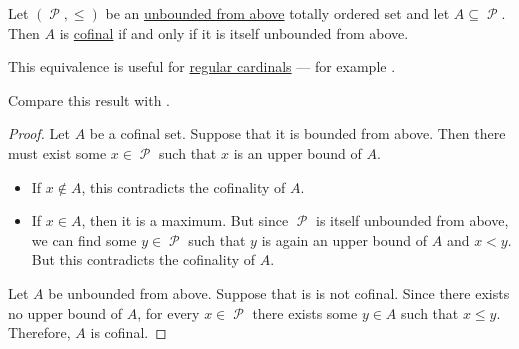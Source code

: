 \begin{proposition}\label{thm:totally_ordered_cofinal_equivalences}
  Let \( (\mscrP, \leq) \) be an \hyperref[def:partially_ordered_set_extremal_points/upper_and_lower_bounds]{unbounded from above} totally ordered set and let \( A \subseteq \mscrP \). Then \( A \) is \hyperref[def:cofinal_set]{cofinal} if and only if it is itself unbounded from above.

  This equivalence is useful for \hyperref[def:regular_cardinal]{regular cardinals} --- for example .

  Compare this result with .
\end{proposition}
\begin{proof}
  \SufficiencySubProof Let \( A \) be a cofinal set. Suppose that it is bounded from above. Then there must exist some \( x \in \mscrP \) such that \( x \) is an upper bound of \( A \).
  \begin{itemize}
    \item If \( x \not\in A \), this contradicts the cofinality of \( A \).
    \item If \( x \in A \), then it is a maximum. But since \( \mscrP \) is itself unbounded from above, we can find some \( y \in \mscrP \) such that \( y \) is again an upper bound of \( A \) and \( x < y \). But this contradicts the cofinality of \( A \).
  \end{itemize}

  \NecessitySubProof Let \( A \) be unbounded from above. Suppose that is is not cofinal. Since there exists no upper bound of \( A \), for every \( x\in \mscrP \) there exists some \( y \in A \) such that \( x \leq y \). Therefore, \( A \) is cofinal.
\end{proof}

